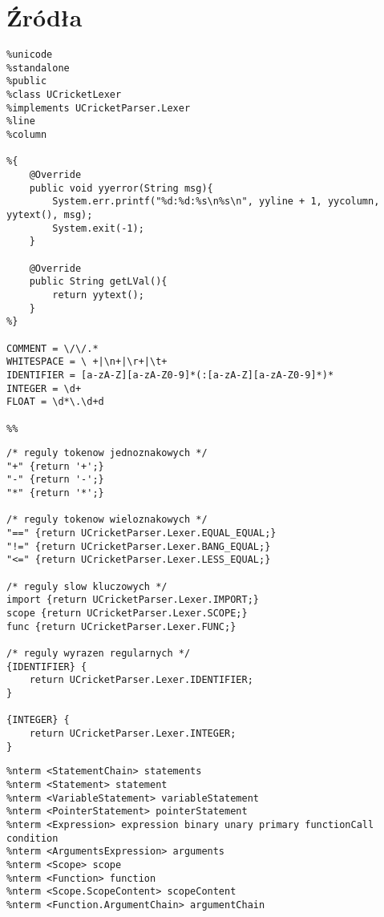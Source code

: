 \chapter{Źródła}
\begin{lstlisting}[caption={Sekcja konfiguracyjna narzędzia JFlex}, label={lst:lexer-konfiguracja}]
%%
%unicode
%standalone
%public
%class UCricketLexer
%implements UCricketParser.Lexer
%line
%column

%{
    @Override
    public void yyerror(String msg){
        System.err.printf("%d:%d:%s\n%s\n", yyline + 1, yycolumn, yytext(), msg);
        System.exit(-1);
    }

    @Override
    public String getLVal(){
        return yytext();
    }
%}

COMMENT = \/\/.*
WHITESPACE = \ +|\n+|\r+|\t+
IDENTIFIER = [a-zA-Z][a-zA-Z0-9]*(:[a-zA-Z][a-zA-Z0-9]*)*
INTEGER = \d+
FLOAT = \d*\.\d+d

%%
\end{lstlisting}

\begin{lstlisting}[caption={Definicje reguł analizatora leksykalnego}, label={lst:lexer-reguły}]
/* reguly tokenow jednoznakowych */
"+" {return '+';}
"-" {return '-';}
"*" {return '*';}

/* reguly tokenow wieloznakowych */
"==" {return UCricketParser.Lexer.EQUAL_EQUAL;}
"!=" {return UCricketParser.Lexer.BANG_EQUAL;}
"<=" {return UCricketParser.Lexer.LESS_EQUAL;} 

/* reguly slow kluczowych */
import {return UCricketParser.Lexer.IMPORT;}
scope {return UCricketParser.Lexer.SCOPE;}
func {return UCricketParser.Lexer.FUNC;}

/* reguly wyrazen regularnych */
{IDENTIFIER} {
    return UCricketParser.Lexer.IDENTIFIER;
}

{INTEGER} {
    return UCricketParser.Lexer.INTEGER;
}
\end{lstlisting}

\begin{lstlisting}[caption={Definicja symboli nieterminalnych analizatora syntaktycznego}, label={lst:parser-nterms}]
%nterm <ValueType> returnedType
%nterm <StatementChain> statements
%nterm <Statement> statement
%nterm <VariableStatement> variableStatement
%nterm <PointerStatement> pointerStatement
%nterm <Expression> expression binary unary primary functionCall condition
%nterm <ArgumentsExpression> arguments
%nterm <Scope> scope
%nterm <Function> function
%nterm <Scope.ScopeContent> scopeContent
%nterm <Function.ArgumentChain> argumentChain
\end{lstlisting}

